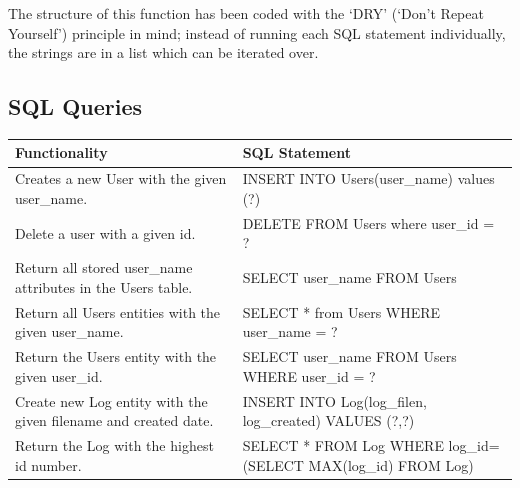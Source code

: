\documentclass[a4paper]{article}
\begin{document}
        The structure of this function has been coded with the `DRY' (`Don't Repeat Yourself') principle in mind;
        instead of running each SQL statement individually, the strings are in a list which can be iterated over.

    \subsection{SQL Queries}

    \begin{table}[H]
        \centering
        \begin{tabular}{|p{5cm}|p{8cm}|}
        \hline
        \textbf{Functionality}                                                                                                                   & \textbf{SQL Statement}                                                                                                                                          \\ \hline
        Creates a new User with the given user\_name.                                                                   & INSERT INTO Users(user\_name) values (?)                                         \\ \hline
        Delete a user with a given id.                                                                                  & DELETE FROM Users where user\_id = ?                                             \\ \hline
        Return all stored user\_name attributes in the Users table.                                                     & SELECT user\_name FROM Users                                                     \\ \hline
        Return all Users entities with the given user\_name.                                                            & SELECT * from Users WHERE user\_name = ?                                         \\ \hline
        Return the Users entity with the given user\_id.                                                                & SELECT user\_name FROM Users WHERE user\_id = ?                                  \\ \hline
        Create new Log entity with the given filename and created date.                                                 & INSERT INTO Log(log\_filen, log\_created) VALUES (?,?)                           \\ \hline
        Return the Log with the highest id number.                                                                      & SELECT * FROM Log WHERE log\_id=(SELECT MAX(log\_id) FROM Log)                   \\ \hline

\end{tabular}
\end{table}
\end{document}

